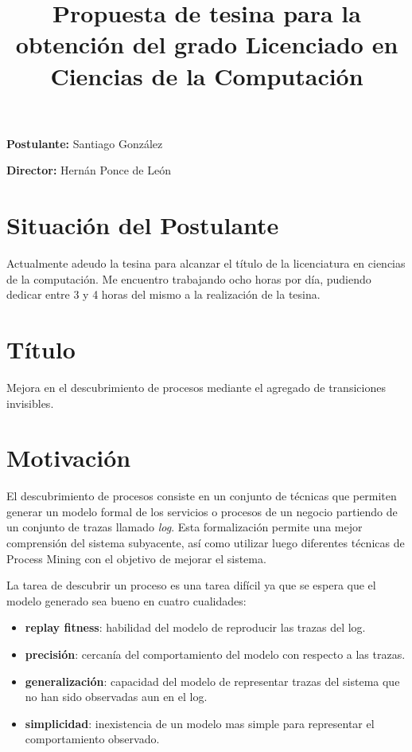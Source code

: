 \documentclass{llncs}
\title{Propuesta de tesina para la obtención del grado Licenciado en Ciencias de la Computación}
\author{}%
\institute{}
\begin{document}
\maketitle

\hspace{-6mm} {\bf Postulante:} Santiago González

\hspace{-6mm} {\bf Director:} Hernán Ponce de León

\section{Situación del Postulante}

Actualmente adeudo la tesina para alcanzar el título de la licenciatura en ciencias de la computación.
Me encuentro trabajando ocho horas por día, pudiendo dedicar entre 3 y 4 horas del mismo a la realización de la tesina.

\section{Título}

Mejora en el descubrimiento de procesos mediante el agregado de transiciones invisibles.

\section{Motivación}
El descubrimiento de procesos consiste en un conjunto de técnicas que permiten generar un modelo
formal de los servicios o procesos de un negocio partiendo de un conjunto 
de trazas llamado \textit{log}. Esta formalización permite una mejor comprensión del sistema subyacente, así 
como utilizar luego diferentes técnicas de Process Mining con el objetivo de mejorar el sistema.


La tarea de descubrir un proceso es una tarea difícil ya que se espera que el modelo generado sea bueno en cuatro cualidades:
\begin{itemize}
\item \textbf{replay fitness}: habilidad del modelo de reproducir las trazas del log.
\item \textbf{precisión}: cercanía del comportamiento del modelo con respecto a las trazas.
\item \textbf{generalización}: capacidad del modelo de representar trazas del sistema que no han sido observadas aun en el log.
\item \textbf{simplicidad}: inexistencia de un modelo mas simple para representar el comportamiento observado.
\end{itemize}
\end{document}
